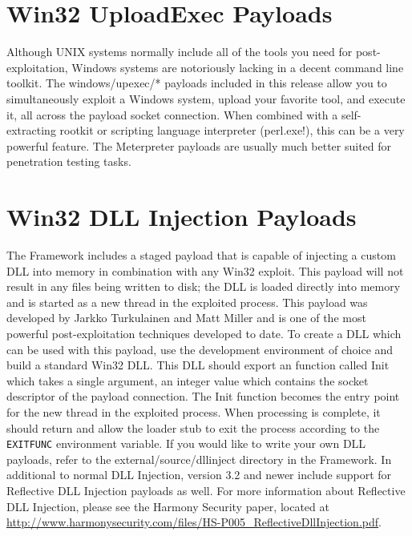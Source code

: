 \documentclass{report}
\begin{document}
\section{Win32 UploadExec Payloads}

\par
Although UNIX systems normally include all of the tools you need for
post-exploitation, Windows systems are notoriously lacking in a decent command
line toolkit. The windows/upexec/* payloads included in this release allow you
to simultaneously exploit a Windows system, upload your favorite tool, and
execute it, all across the payload socket connection. When combined with a
self-extracting rootkit or scripting language interpreter (perl.exe!), this can
be a very powerful feature. The Meterpreter payloads are usually much better
suited for penetration testing tasks.

\section{Win32 DLL Injection Payloads}

\par
The Framework includes a staged payload that is capable of injecting a custom
DLL into memory in combination with any Win32 exploit. This payload will not
result in any files being written to disk; the DLL is loaded directly into
memory and is started as a new thread in the exploited process. This payload was
developed by Jarkko Turkulainen and Matt Miller and is one of the most powerful
post-exploitation techniques developed to date. To create a DLL which can be
used with this payload, use the development environment of choice and build a
standard Win32 DLL. This DLL should export an function called Init which takes a
single argument, an integer value which contains the socket descriptor of the
payload connection. The Init function becomes the entry point for the new thread
in the exploited process. When processing is complete, it should return and
allow the loader stub to exit the process according to the \texttt{EXITFUNC}
environment variable. If you would like to write your own DLL payloads, refer to
the external/source/dllinject directory in the Framework. In additional to
normal DLL Injection, version 3.2 and newer include support for Reflective DLL
Injection payloads as well. For more information about Reflective DLL Injection,
please see the Harmony Security paper, located at
\url{http://www.harmonysecurity.com/files/HS-P005_ReflectiveDllInjection.pdf}.
\end{document}
